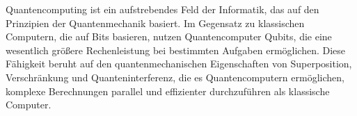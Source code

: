 
Quantencomputing ist ein aufstrebendes Feld der Informatik, das auf den Prinzipien der Quantenmechanik basiert. 
Im Gegensatz zu klassischen Computern, die auf Bits basieren, nutzen Quantencomputer Qubits, die eine wesentlich 
größere Rechenleistung bei bestimmten Aufgaben ermöglichen. Diese Fähigkeit beruht auf den quantenmechanischen 
Eigenschaften von Superposition, Verschränkung und Quanteninterferenz, die es Quantencomputern ermöglichen, 
komplexe Berechnungen parallel und effizienter durchzuführen als klassische Computer. 

